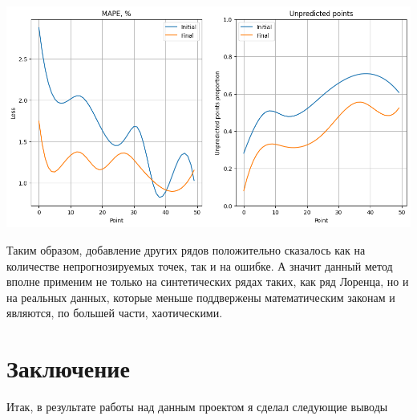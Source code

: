 \documentclass[a4paper, 12pt]{extarticle}
\begin{document}
\begin{center}
    \includegraphics[width=\textwidth]{img/consumption.png}
\end{center}

Таким образом, добавление других рядов положительно сказалось как на количестве непрогнозируемых точек, так и на ошибке. А значит данный метод вполне применим не только на синтетических рядах таких, как ряд Лоренца, но и на реальных данных, которые меньше поддвержены математическим законам и являются, по большей части, хаотическими.

\newpage
\section{Заключение}

Итак, в результате работы над данным проектом я сделал следующие выводы
\end{document}

